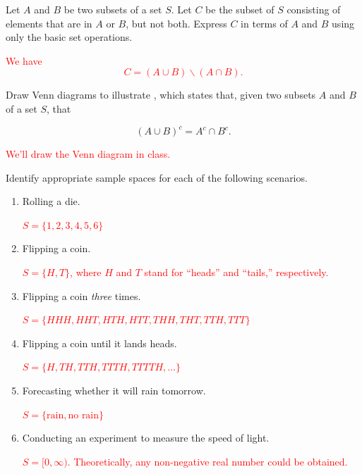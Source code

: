 \documentclass[12pt,reqno]{amsart}
\begin{document}
\bigskip

\prob Let $A$ and $B$ be two subsets of a set $S$. Let $C$ be the subset of $S$ consisting of elements that are in $A$ or $B$, but not both. Express $C$ in terms of $A$ and $B$ using only the basic set operations.

\bigskip
\textcolor{red}{We have
    \[C = (A\cup B) \smallsetminus (A\cap B). \]}
\bigskip
















\prob Draw Venn diagrams to illustrate , which states that, given two subsets $A$ and $B$ of a set $S$, that

    \[(A\cup B)^c = A^c \cap B^c.\]

\bigskip
\textcolor{red}{We'll draw the Venn diagram in class.}
\bigskip











\prob Identify appropriate sample spaces for each of the following scenarios.

\medskip
\begin{enumerate}
    \item Rolling a die.
    
    \medskip
    \textcolor{red}{$S = \{1,2,3,4,5,6\}$}
    \bigskip

    \item Flipping a coin.
    
    \medskip
    \textcolor{red}{$S = \{H,T\}$, where $H$ and $T$ stand for ``heads'' and ``tails,'' respectively.}
    \bigskip

    \item Flipping a coin \textit{three} times.
    
    \medskip
    \textcolor{red}{$S = \{HHH, HHT, HTH, HTT, THH, THT, TTH, TTT \}$}
    \bigskip

    \item Flipping a coin until it lands heads.
    
    \medskip
    \textcolor{red}{$S = \{H, TH, TTH, TTTH, TTTTH, \ldots\}$}
    \bigskip

    \item Forecasting whether it will rain tomorrow.
    
    \medskip
    \textcolor{red}{$S = \{\text{rain}, \text{no rain}\}$}
    \bigskip

    \item Conducting an experiment to measure the speed of light.
    
    \medskip
    \textcolor{red}{$S = [0,\infty)$. Theoretically, any non-negative real number could be obtained.}
\end{enumerate}
\end{document}
